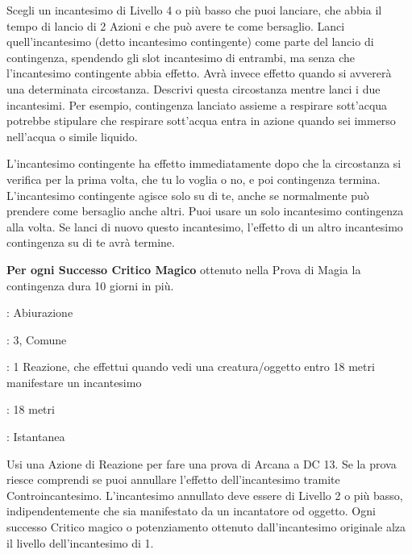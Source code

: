 \begin{multicols}{2}
Scegli un incantesimo di Livello 4 o più basso che puoi lanciare, che abbia il tempo di lancio di 2 Azioni e che può avere te come bersaglio. Lanci quell'incantesimo (detto incantesimo contingente) come parte del lancio di contingenza, spendendo gli slot incantesimo di entrambi, ma senza che l'incantesimo contingente abbia effetto. Avrà invece effetto quando si avvererà una determinata circostanza. Descrivi questa circostanza mentre lanci i due incantesimi. Per esempio, contingenza lanciato assieme a respirare sott'acqua potrebbe stipulare che respirare sott'acqua entra in azione quando sei immerso nell'acqua o simile liquido.

L'incantesimo contingente ha effetto immediatamente dopo che la circostanza si verifica per la prima volta, che tu lo voglia o no, e poi contingenza termina. L'incantesimo contingente agisce solo su di te, anche se normalmente può prendere come bersaglio anche altri. Puoi usare un solo incantesimo contingenza alla volta. Se lanci di nuovo questo incantesimo, l'effetto di un altro incantesimo contingenza su di te avrà termine.

\textbf{Per ogni Successo Critico Magico} ottenuto nella Prova di Magia la contingenza dura 10 giorni in più.

\noindent\colorbox{OBSSgold!10}{
\begin{minipage}{0.95\linewidth}
\begin{description}[noitemsep, topsep=0pt, parsep=0pt, partopsep=0pt, leftmargin=0cm, labelwidth=1.3cm]
	\item[\textbf{Lista}]: Abiurazione
	\item[\textbf{Livello}]: 3, Comune
	\item[\textbf{Lancio}]: 1 Reazione, che effettui quando vedi una creatura/oggetto entro 18 metri manifestare un incantesimo
	\item[\textbf{Gittata}]: 18 metri
	\item[\textbf{Durata}]: Istantanea
\end{description}
\end{minipage}}\smallskip

Usi una Azione di Reazione per fare una prova di Arcana a DC 13. Se la prova riesce comprendi se puoi annullare l'effetto dell'incantesimo tramite Controincantesimo. L'incantesimo annullato deve essere di Livello 2 o più basso, indipendentemente che sia manifestato da un incantatore od oggetto. Ogni successo Critico magico o potenziamento ottenuto dall'incantesimo originale alza il livello dell'incantesimo di 1.


\end{multicols}
